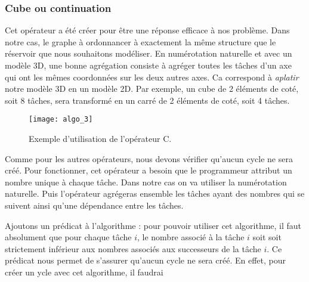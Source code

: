 \subsubsection{Cube ou continuation}
Cet opérateur a été créer pour être une réponse efficace à nos problème.
%
Dans notre cas, le graphe à ordonnancer à exactement la même structure que le réservoir que nous souhaitons modéliser.
%
En numérotation naturelle et avec un modèle 3D, une bonne agrégation consiste à agréger toutes les tâches d'un axe qui ont les mêmes coordonnées sur les deux autres axes.
%
Ca correspond à {\em aplatir} notre modèle 3D en un modèle 2D.
%
Par exemple, un cube de 2 éléments de coté, soit 8 tâches, sera transformé en un carré de 2 éléments de coté, soit 4 tâches.

\begin{figure}[t!]
  \centering
  \texttt{[image: algo\_3]}
  \caption{Exemple d'utilisation de l'opérateur C.}
  \label{fig:algo_C}
\end{figure}

Comme pour les autres opérateurs, nous devons vérifier qu'aucun cycle ne sera créé.
%
Pour fonctionner, cet opérateur a besoin que le programmeur attribut un nombre unique à chaque tâche.
%
Dans notre cas on va utiliser la numérotation naturelle.
%
Puis l'opérateur agrégeras ensemble les tâches ayant des nombres qui se suivent ainsi qu'une dépendance entre les tâches.

Ajoutons un prédicat à l'algorithme : pour pouvoir utiliser cet algorithme, il faut absolument que pour chaque tâche $i$, le nombre associé à la tâche $i$ soit soit strictement inférieur aux nombres associés aux successeurs de la tâche $i$.
%
Ce prédicat nous permet de s'assurer qu'aucun cycle ne sera créé.
%
En effet, pour créer un ycle avec cet algorithme, il faudrai   
